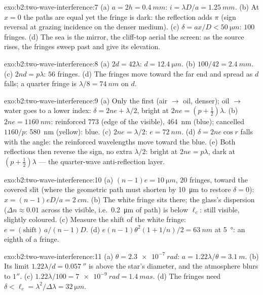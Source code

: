 \begin{solution}{exo:b2:two-wave-interference:7}
(a) $a = 2h = \qty{0.4}{mm}$: $i = \lambda D/a = \qty{1.25}{mm}$. (b) At $x = 0$ the paths
are equal yet the fringe is dark: the reflection adds $\pi$ (sign
reversal at grazing incidence on the denser medium). (c) $\delta = ax/D <
\qty{50}{\micro m}$: $100$ fringes. (d) The sea is the mirror, the cliff-top
aerial the screen: as the source rises, the fringes sweep past and
give its elevation.
\end{solution}

\begin{solution}{exo:b2:two-wave-interference:8}
(a) $2d = 42\lambda$: $d = \qty{12.4}{\micro m}$. (b) $100/42 = \qty{2.4}{mm}$. (c) $2nd = p\lambda$:
$56$ fringes. (d) The fringes move toward the far end and spread as $d$
falls; a quarter fringe is $\lambda/8 = \qty{74}{nm}$ on $d$.
\end{solution}

\begin{solution}{exo:b2:two-wave-interference:9}
(a) Only the first (air $\to$ oil, denser); oil $\to$ water goes to a lower
index: $\delta = 2ne + \lambda/2$, bright at $2ne = (p + \tfrac12)\lambda$. (b) $2ne =
\qty{1160}{nm}$: reinforced $773$ (edge of the visible), \qty{464}{nm} (blue);
cancelled $1160/p$: \qty{580}{nm} (yellow): blue. (c) $2ne = \lambda/2$: $e = \qty{72}{nm}$.
(d) $\delta = 2ne\cos r$ falls with the angle: the reinforced wavelengths
move toward the blue. (e) Both reflections then reverse the sign, no
extra $\lambda/2$: bright at $2ne = p\lambda$, dark at $(p + \tfrac12)\lambda$ --- the
quarter-wave anti-reflection layer.
\end{solution}

\begin{solution}{exo:b2:two-wave-interference:10}
(a) $(n - 1)e = \qty{10}{\micro m}$, $20$ fringes, toward the covered slit (where
the geometric path must shorten by \qty{10}{\micro m} to restore $\delta = 0$):
$x = (n - 1)eD/a = \qty{2}{cm}$. (b) The white fringe sits there; the glass's
dispersion ($\Delta n \approx 0.01$ across the visible, i.e.\ \qty{0.2}{\micro m} of path)
is below $\ell_c$: still visible, slightly coloured. (c) Measure the
shift of the white fringe: $e = (\text{shift})\,a/(n - 1)D$. (d) $e(n - 1)\theta^2
(1 + 1/n)/2 = \qty{63}{nm}$ at \qty{5}{\degree}: an eighth of a fringe.
\end{solution}

\begin{solution}{exo:b2:two-wave-interference:11}
(a) $\theta = \qty{2.3e-7}{rad}$: $a = 1.22\lambda/\theta = \qty{3.1}{m}$. (b) Its limit $1.22\lambda/d =
\qty{0.057}{''}$ is above the star's diameter, and the atmosphere blurs
to $1''$. (c) $1.22\lambda/100 = \qty{7e-9}{rad} = \qty{1.4}{mas}$. (d) The fringes need
$\delta < \ell_c = \lambda^2/\Delta\lambda = \qty{32}{\micro m}$.
\end{solution}

